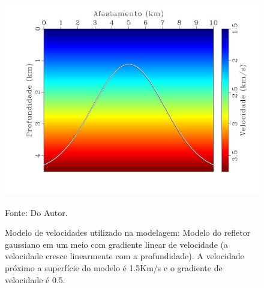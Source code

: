 \begin{figure}[H]
\caption{Modelo de velocidades utilizado na modelagem: Modelo do refletor gaussiano em um meio com
gradiente linear de velocidade (a velocidade cresce linearmente com a profundidade). A velocidade próximo 
a superfície do modelo é 1.5Km/s e o gradiente de velocidade é 0.5.}
\begin{center}
\includegraphics[scale=0.3]{images/dome.jpeg}
\vspace{-0.3cm}
\end{center}
\begin{center}
 Fonte: Do Autor.
\end{center}
\label{fig:4.1}
\end{figure}

